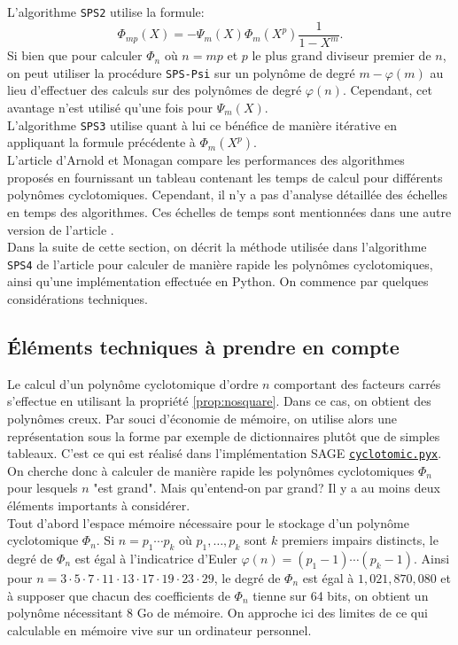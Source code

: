 \documentclass{article}
\theoremstyle{break}                  %
\begin{document}
L'algorithme \texttt{SPS2} utilise la formule:
$$\Phi_{mp}(X) = - \Psi_m(X) \Phi_m(X^p) \frac{1}{1 - X^m}.$$ Si bien que pour calculer $\Phi_{n}$ où $n = mp$ et $p$ le plus grand diviseur premier de $n$, on peut utiliser la procédure \texttt{SPS-Psi} sur un polynôme de degré $m - \varphi(m)$ au lieu d'effectuer des calculs sur des polynômes de degré $\varphi(n)$. Cependant, cet avantage n'est utilisé qu'une fois pour $\Psi_m(X)$.\\

L'algorithme \texttt{SPS3} utilise quant à lui ce bénéfice de manière itérative en appliquant la formule précédente à $\Phi_m(X^p)$.\\

L'article d'Arnold et Monagan compare les performances des algorithmes proposés en fournissant un tableau contenant les temps de calcul pour différents polynômes cyclotomiques. Cependant, il n'y a pas d'analyse détaillée des échelles en temps des algorithmes. Ces échelles de temps sont mentionnées dans une autre version de l'article \cite{monagan+}.\\

Dans la suite de cette section, on décrit la méthode utilisée dans l'algorithme \texttt{SPS4} de l'article pour calculer de manière rapide les polynômes cyclotomiques, ainsi qu'une implémentation effectuée en Python. On commence par quelques considérations techniques.

\subsection*{Éléments techniques à prendre en compte}

Le calcul d'un polynôme cyclotomique d'ordre $n$ comportant des facteurs carrés s'effectue en utilisant la propriété \ref{prop:nosquare}. Dans ce cas, on obtient des polynômes creux. Par souci d'économie de mémoire, on utilise alors une représentation sous la forme par exemple de dictionnaires plutôt que de simples tableaux. C'est ce qui est réalisé dans l'implémentation  
SAGE \href{https://github.com/sagemath/sage/blob/develop/src/sage/rings/polynomial/cyclotomic.pyx}{\texttt{cyclotomic.pyx}}.\\

On cherche donc à calculer de manière rapide les polynômes cyclotomiques $\Phi_n$ pour lesquels $n$ "est grand". Mais qu'entend-on par grand? Il y a au moins deux éléments importants à considérer.\\

Tout d'abord l'espace mémoire nécessaire pour le stockage d'un polynôme cyclotomique $\Phi_n$. Si $n = p_1 \cdots p_k$ où $p_1, \dots, p_k$ sont $k$ premiers impairs distincts, le degré de $\Phi_n$ est égal à l'indicatrice d'Euler $\varphi(n) = (p_1-1) \cdots (p_k-1)$. Ainsi pour $n = 3 \cdot 5 \cdot 7 \cdot 11 \cdot 13 \cdot 17 \cdot 19 \cdot 23 \cdot 29$, le degré de $\Phi_n$ est égal à $1,021,870,080$ et à supposer que chacun des coefficients de $\Phi_n$ tienne sur 64 bits, on obtient un polynôme nécessitant 8 Go de mémoire. On approche ici des limites de ce qui calculable en mémoire vive sur un ordinateur personnel.\\
\end{document}
